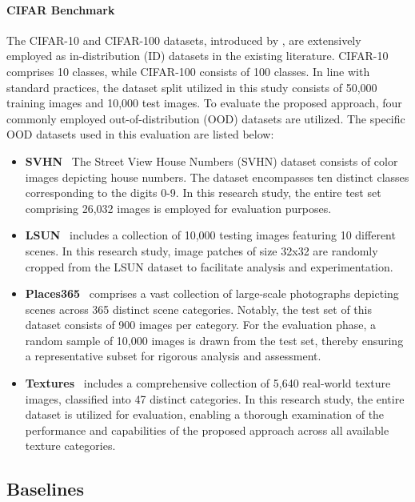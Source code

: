 \documentclass{article}
\begin{document}
\paragraph{CIFAR Benchmark} The CIFAR-10 and CIFAR-100 datasets, introduced by \cite{krizhevsky2009learning}, are extensively employed as in-distribution (ID) datasets in the existing literature. CIFAR-10 comprises 10 classes, while CIFAR-100 consists of 100 classes. In line with standard practices, the dataset split utilized in this study consists of 50,000 training images and 10,000 test images. To evaluate the proposed approach, four commonly employed out-of-distribution (OOD) datasets are utilized. The specific OOD datasets used in this evaluation are listed below:
\begin{itemize}
    \item \textbf{SVHN}~\cite{netzer2011reading} The Street View House Numbers (SVHN) dataset consists of color images depicting house numbers. The dataset encompasses ten distinct classes corresponding to the digits 0-9. In this research study, the entire test set comprising 26,032 images is employed for evaluation purposes.
    \item \textbf{LSUN}~\cite{yu2015lsun} includes a collection of 10,000 testing images featuring 10 different scenes. In this research study, image patches of size 32x32 are randomly cropped from the LSUN dataset to facilitate analysis and experimentation.
    \vspace{-0.1cm}
    \item \textbf{Places365}~\cite{zhou2017places} comprises a vast collection of large-scale photographs depicting scenes across 365 distinct scene categories. Notably, the test set of this dataset consists of 900 images per category. For the evaluation phase, a random sample of 10,000 images is drawn from the test set, thereby ensuring a representative subset for rigorous analysis and assessment.
    \vspace{-0.1cm}
    \item \textbf{Textures}~\cite{cimpoi14describing} includes a comprehensive collection of 5,640 real-world texture images, classified into 47 distinct categories. In this research study, the entire dataset is utilized for evaluation, enabling a thorough examination of the performance and capabilities of the proposed approach across all available texture categories.
\end{itemize}

\subsection{Baselines}
\label{app:baseline}
\end{document}

